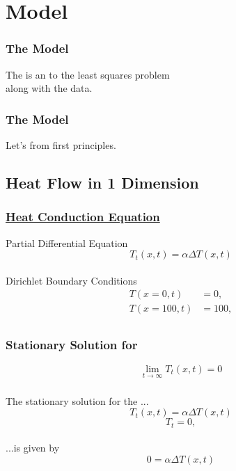 % 

\section{Model}
%
\begin{frame}\frametitle{The Model}
\center
The  is an  to the least squares problem\\ along with the data.
\end{frame}
%
\begin{frame}\frametitle{The Model}
Let's  from first principles.
\end{frame}
%

%
\subsection{Heat Flow in 1 Dimension}
%
\begin{frame}\frametitle{\href{https://mathworld.wolfram.com/HeatConductionEquation.html}{Heat Conduction Equation}}
Partial Differential Equation \\
\begin{equation}
	T_{t}(x,t) = \alpha \Delta T(x,t)
\label{eq:pde heat}
\end{equation}
\ \\[10pt]
Dirichlet Boundary Conditions\\
\begin{equation}
\begin{split}
	T(x=0,t) &= 0, \\
	T(x=100,t) &= 100,\\
\end{split}
\end{equation}
\end{frame}
%
%
\begin{frame}\frametitle{Stationary Solution for \eqnHeat}
\begin{equation}
	\lim\limits_{t\to\infty} T_{t}(x,t) = 0
\end{equation}
\end{frame}
%
%
\begin{frame}\frametitle{\eqnLaplace}
The stationary solution for the \bl{\eqnHeat}...
\begin{equation}
	T_{t}(x,t) = \alpha \Delta T(x,t)
\label{eq:pde heat}
\end{equation}
\begin{equation*}
	T_{t} = 0,
\end{equation*}
\ \\
	\pause
...is given by \bl{\eqnLaplace}
\begin{equation}
	0 = \alpha \Delta T(x,t)
\label{eq:pde heat}
\end{equation}
\end{frame}
%

